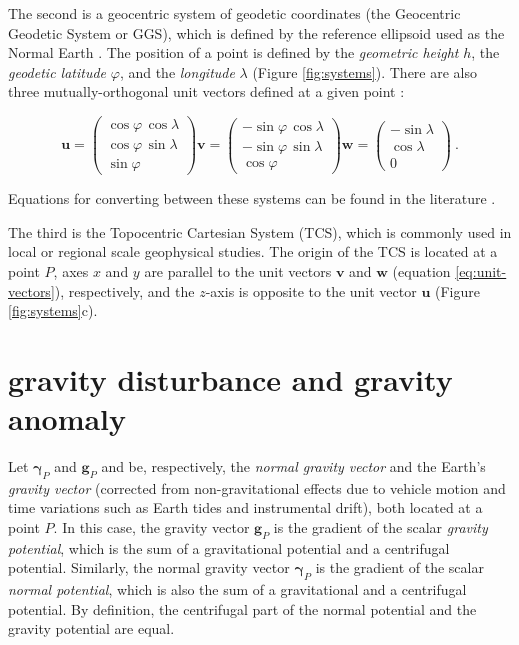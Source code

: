 \documentclass[paper,twocolumn,twoside]{geophysics}
\begin{document}
The second is a geocentric system of geodetic coordinates
(the Geocentric Geodetic System or GGS),
which is defined by the reference ellipsoid used as the Normal Earth
\citep{heiskanen-moritz1967, soler1976, torge2012, bouman_etal2013}.
The position of a point is defined by
the \textit{geometric height} $h$,
the \textit{geodetic latitude} $\varphi$,
and the \textit{longitude} $\lambda$ (Figure \ref{fig:systems}).
There are also three mutually-orthogonal unit vectors defined at a given point
\citep{soler1976}:

\begin{equation}
    \mathbf{u} =
    \begin{pmatrix}
        \cos\varphi \, \cos\lambda \\
        \cos\varphi \, \sin\lambda \\
        \sin\varphi
    \end{pmatrix}
    \mathbf{v} =
    \begin{pmatrix}
        -\sin\varphi \, \cos\lambda \\
        -\sin\varphi \, \sin\lambda \\
        \cos\varphi
    \end{pmatrix}
    \mathbf{w} =
    \begin{pmatrix}
        -\sin\lambda \\
        \cos\lambda \\
        0
    \end{pmatrix} \: .
    \label{eq:unit-vectors}
\end{equation}

\noindent Equations for converting between these systems can be found in
the literature \citep[e.g.,][]{heiskanen-moritz1967, torge2012,
bouman_etal2013}.

The third is the Topocentric Cartesian System (TCS),
which is commonly used in local or regional scale geophysical studies.
The origin of the TCS is located at a point $P$,
axes $x$ and $y$ are parallel to
the unit vectors $\mathbf{v}$ and $\mathbf{w}$
(equation \ref{eq:unit-vectors}), respectively,
and the $z$-axis is opposite to the unit vector $\mathbf{u}$
(Figure \ref{fig:systems}c).


\section{gravity disturbance and gravity anomaly}

Let $\boldsymbol{\gamma}_{P}$ and $\mathbf{g}_{P}$ and be, respectively,
the \textit{normal gravity vector} and the Earth's \textit{gravity vector}
(corrected from non-gravitational effects due to vehicle
motion and time variations such as Earth tides and instrumental drift),
both located at a point $P$.
In this case, the gravity vector $\mathbf{g}_{P}$ is the
gradient of the scalar \textit{gravity potential},
which is the sum of a gravitational potential and a centrifugal potential.
Similarly, the normal gravity vector $\boldsymbol{\gamma}_{P}$ is the
gradient of the scalar \textit{normal potential},
which is also the sum of a gravitational and a centrifugal potential.
By definition, the centrifugal part of
the normal potential and the gravity potential are equal.
\end{document}
